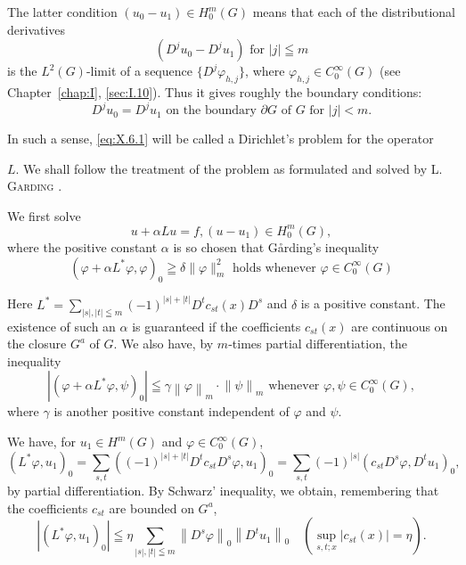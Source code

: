 The latter condition $(u_0 - u_1) \in H_0^m(G)$ means that each of the distributional derivatives 
\begin{equation}\label{eq:X.6.2}
\left(D ^{j} u _{0} - D ^{j} u _{1}\right) \text{ for } | j | \leqq m
\end{equation}
is the $L^{2}(G)$-limit of a sequence $\{D^{j}\varphi_{h,j}\}$, where $\varphi_{h,j} \in C_{0}^{\infty}(G)$ (see Chapter~\ref{chap:I}, \ref{sec:I.10}). Thus it gives roughly the boundary conditions: 
\begin{equation}\label{eq:X.6.3}
D ^{j} u _{0} = D ^{j} u _{1} \text{ on the boundary } \partial G \text{ of } G \text{ for } | j | < m.
\end{equation}

In such a sense, \eqref{eq:X.6.1} will be called a Dirichlet's problem for the operator 

$L$. We shall follow the treatment of the problem as formulated and solved by L. \textsc{Garding} \cite{garding74}. 

We first solve 
\begin{equation}\label{eq:X.6.4}
u + \alpha L u = f, (u - u _{1}) \in H _{0} ^{m} (G),
\end{equation}
where the positive constant $\alpha$ is so chosen that Gårding's inequality 
\begin{equation}\label{eq:X.6.5}
(\varphi + \alpha L ^{*} \varphi , \varphi) _{0} \geqq \delta \| \varphi \| _{m} ^{2} \text{ holds whenever } \varphi \in C _{0} ^{\infty} (G)
\end{equation}

Here $L^{*} = \sum\limits_{|s|, |t| \leqq m} (-1)^{|s|+|t|} D^{t} c_{st}(x) D^{s}$ and $\delta$ is a positive constant. The existence of such an $\alpha$ is guaranteed if the coefficients $c_{st}(x)$ are continuous on the closure $G^{a}$ of $G$. We also have, by $m$-times partial differentiation, the inequality 
\begin{equation}\label{eq:X.6.6}
\left| \left(\varphi + \alpha L ^{*} \varphi , \psi\right) _{0} \right| \leqq \gamma \left\| \varphi \right\| _{m} \cdot \left\| \psi \right\| _{m} \text{ whenever } \varphi , \psi \in C _{0} ^{\infty} (G),
\end{equation}
where $\gamma$ is another positive constant independent of $\varphi$ and $\psi$. 

We have, for $u_{1} \in H^{m}(G)$ and $\varphi \in C_0^\infty(G)$, 
\[
(L ^{*} \varphi , u _{1}) _{0} = \sum\limits_{s,t} ((- 1) ^{|s|+|t|} D ^{t} c _{st} D ^{s} \varphi , u _{1}) _{0} = \sum\limits_{s,t} (- 1) ^{|s|} (c _{st} D ^{s} \varphi , D ^{t} u _{1}) _{0},
\]
by partial differentiation. By Schwarz' inequality, we obtain, remembering that the coefficients $c_{st}$ are bounded on $G^{a}$, 
\[
\left| \left(L ^{*} \varphi , u _{1}\right) _{0} \right| \leqq \eta \sum\limits_{| s |, | t | \leqq m} \left\| D ^{s} \varphi \right\| _{0} \left\| D ^{t} u _{1} \right\| _{0} \quad \left(\sup\limits _{s,t;x} \left| c _{st} (x) \right| = \eta\right).
\]

